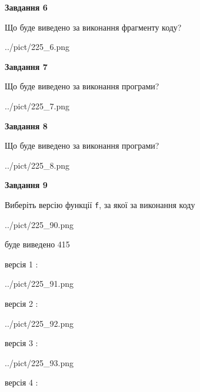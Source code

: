 \documentclass[12pt, ukrainian]{article}
\def\code#1{\Verb!#1!}
\begin{document}
{\begin {large}
{\begin {center}\textbf{Завдання 6}\end {center}}

Що буде виведено за виконання фрагменту коду?\par
\begin{center}
	{../pict/225_6.png}
\end{center}
\newpage

{\begin {center}\textbf{Завдання 7}\end {center}}

Що буде виведено за виконання програми?\par
\begin{center}
	{../pict/225_7.png}
\end{center}
\newpage

{\begin {center}\textbf{Завдання 8}\end {center}}

Що буде виведено за виконання програми?\par
\begin{center}
	{../pict/225_8.png}
\end{center}
\newpage

{\begin {center}\textbf{Завдання 9}\end {center}}

Виберіть версію функції \code{f}, за якої за виконання коду
\begin{center}
	{../pict/225_90.png}
\end{center}
буде виведено 415

\vspace{5mm}
версія 1 :

\begin{center}
	{../pict/225_91.png}
\end{center}
версія 2 :

\begin{center}
	{../pict/225_92.png}
\end{center}
версія 3 :

\begin{center}
	{../pict/225_93.png}
\end{center}
версія 4 :


\end{large}}
\end{document}
